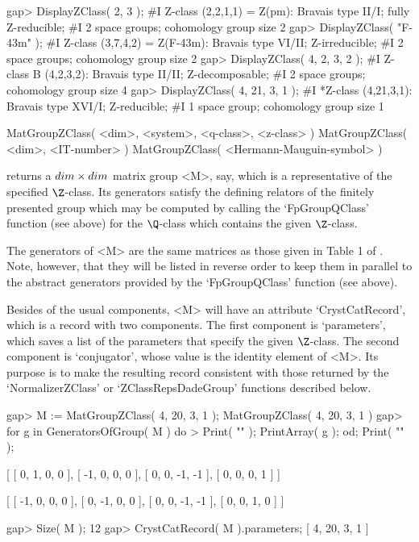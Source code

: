 \beginexample
gap> DisplayZClass( 2, 3 );
#I    Z-class (2,2,1,1) = Z(pm): Bravais type II/I; fully Z-reducible;
#I     2 space groups; cohomology group size 2
gap> DisplayZClass( "F-43m" );
#I    Z-class (3,7,4,2) = Z(F-43m): Bravais type VI/II; Z-irreducible;
#I     2 space groups; cohomology group size 2
gap> DisplayZClass( 4, 2, 3, 2 );
#I    Z-class B (4,2,3,2): Bravais type II/II; Z-decomposable;
#I     2 space groups; cohomology group size 4
gap> DisplayZClass( 4, 21, 3, 1 );
#I   *Z-class (4,21,3,1): Bravais type XVI/I; Z-reducible;
#I     1 space group; cohomology group size 1
\endexample

\>MatGroupZClass( <dim>, <system>, <q-class>, <z-class> )
\>MatGroupZClass( <dim>, <IT-number> )
\>MatGroupZClass( <Hermann-Mauguin-symbol> )

returns a $dim \times dim$ matrix group <M>, say, which is a
representative of the specified $\Z$-class.  Its generators satisfy
the defining relators of the finitely presented group which may be
computed by calling the `FpGroupQClass' function (see above) for the
$\Q$-class which contains the given $\Z$-class.

The generators of <M> are the same matrices as those given  in Table 1 of
\cite{BBNWZ78}. Note, however, that they will  be listed in reverse order
to  keep them  in parallel  to  the abstract  generators provided by  the
`FpGroupQClass' function (see above).

Besides of the usual components, <M> will have an attribute
`CrystCatRecord', which is a record with two components.  The
first component is `parameters', which saves a list of the parameters
that specify the given $\Z$-class. The second component is
`conjugator', whose value is the identity element of <M>. Its purpose
is to make the resulting record consistent with those returned by
the `NormalizerZClass' or `ZClassRepsDadeGroup' functions described
below.

\beginexample
gap> M := MatGroupZClass( 4, 20, 3, 1 );
MatGroupZClass( 4, 20, 3, 1 )
gap> for g in GeneratorsOfGroup( M ) do
>  Print( "\n" ); PrintArray( g ); od; Print( "\n" );

[ [   0,   1,   0,   0 ],
  [  -1,   0,   0,   0 ],
  [   0,   0,  -1,  -1 ],
  [   0,   0,   0,   1 ] ]

[ [  -1,   0,   0,   0 ],
  [   0,  -1,   0,   0 ],
  [   0,   0,  -1,  -1 ],
  [   0,   0,   1,   0 ] ]

gap> Size( M );
12
gap> CrystCatRecord( M ).parameters;
[ 4, 20, 3, 1 ]
\endexample

